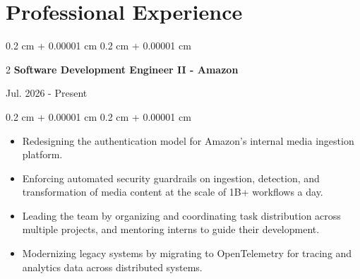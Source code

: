 \documentclass[10pt, letterpaper]{article}
\newenvironment{highlightsforbulletentries}{
    \begin{itemize}[
        topsep=0.10 cm,
        parsep=0.10 cm,
        partopsep=0pt,
        itemsep=0pt,
        leftmargin=10pt
    ]
}{
    \end{itemize}
} %
\newenvironment{onecolentry}{
    \begin{adjustwidth}{
        0.2 cm + 0.00001 cm
    }{
        0.2 cm + 0.00001 cm
    }
}{
    \end{adjustwidth}
} %
\newenvironment{twocolentry}[2][]{
    \onecolentry
    \def\secondColumn{#2}
    \setcolumnwidth{\fill, 4.5 cm}
    \begin{paracol}{2}
}{
    \switchcolumn \raggedleft \secondColumn
    \end{paracol}
    \endonecolentry
} %
\begin{document}
    \section{Professional Experience}
        \begin{twocolentry}{
            Jul. 2026 - Present
        }{
            \textbf{Software Development Engineer II - Amazon}
        }
        \end{twocolentry}
        \vspace{0.1 cm}
        \begin{onecolentry}
            \begin{highlightsforbulletentries}
                \item Redesigning the authentication model for Amazon's internal media ingestion platform.
                \item Enforcing automated security guardrails on ingestion, detection, and transformation of media
                content at the scale of 1B+ workflows a day.
                \item Leading the team by organizing and coordinating task distribution across multiple projects,
                and mentoring interns to guide their development.
                \item Modernizing legacy systems by migrating to OpenTelemetry for tracing and analytics data
                across distributed systems.
            \end{highlightsforbulletentries}
        \end{onecolentry}

        \vspace{0.2 cm}
\end{document}
